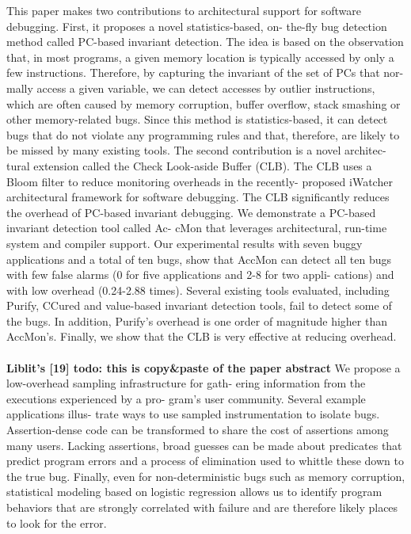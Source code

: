This paper makes two contributions to architectural support for software debugging. First, it proposes a novel statistics-based, on- the-fly bug detection method called PC-based invariant detection. The idea is based on the observation that, in most programs, a given memory location is typically accessed by only a few instructions. Therefore, by capturing the invariant of the set of PCs that nor- mally access a given variable, we can detect accesses by outlier instructions, which are often caused by memory corruption, buffer overflow, stack smashing or other memory-related bugs. Since this method is statistics-based, it can detect bugs that do not violate any programming rules and that, therefore, are likely to be missed by many existing tools. The second contribution is a novel architec- tural extension called the Check Look-aside Buffer (CLB). The CLB uses a Bloom filter to reduce monitoring overheads in the recently- proposed iWatcher architectural framework for software debugging. The CLB significantly reduces the overhead of PC-based invariant debugging.
We demonstrate a PC-based invariant detection tool called Ac- cMon that leverages architectural, run-time system and compiler support. Our experimental results with seven buggy applications and a total of ten bugs, show that AccMon can detect all ten bugs with few false alarms (0 for five applications and 2-8 for two appli- cations) and with low overhead (0.24-2.88 times). Several existing tools evaluated, including Purify, CCured and value-based invariant detection tools, fail to detect some of the bugs. In addition, Purify’s overhead is one order of magnitude higher than AccMon’s. Finally, we show that the CLB is very effective at reducing overhead.
\\
\\
\noindent \textbf{Liblit's [19] todo: this is copy\&paste of the paper abstract}
We propose a low-overhead sampling infrastructure for gath- ering information from the executions experienced by a pro- gram’s user community. Several example applications illus- trate ways to use sampled instrumentation to isolate bugs. Assertion-dense code can be transformed to share the cost of assertions among many users. Lacking assertions, broad guesses can be made about predicates that predict program errors and a process of elimination used to whittle these down to the true bug. Finally, even for non-deterministic bugs such as memory corruption, statistical modeling based on logistic regression allows us to identify program behaviors that are strongly correlated with failure and are therefore likely places to look for the error.
